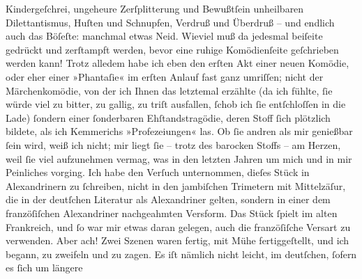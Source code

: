 \begin{ledgroupsized}[t]{13cm}
               Kindergeſchrei, ungeheure Zerſplitterung und Bewußtſein unheilbaren Dilettantismus,
               Huſten und Schnupfen, Verdruß und Überdruß – und endlich auch das Böſeſte: manchmal
               etwas Neid. Wieviel muß da jedesmal beiſeite gedrückt und zerſtampft werden, bevor
               eine ruhige Komödienſeite geſchrieben werden kann!\pend
           \pstart
           Trotz alledem habe ich eben den erſten Akt einer neuen Komödie, oder eher einer
               »Phantaſie« im erſten Anlauf fast ganz umriſſen; nicht der Märchenkomödie, von der ich Ihnen das
               letztemal erzählte (da ich fühlte, ſie würde viel zu bitter, zu gallig, zu triſt
               ausfallen, ſchob ich ſie entſchloſſen in die Lade) ſondern einer ſonderbaren Ehſtandstragödie, deren Stoff ſich
               plötzlich bildete, als ich Kemmerichs »Profezeiungen« las. Ob ſie andren als mir genießbar
               ſein wird, weiß ich nicht; mir liegt ſie – trotz des ba{\pb}rocken Stoffs – am Herzen, weil ſie viel aufzunehmen vermag, was in den letzten
               Jahren um mich und in mir Peinliches vorging.\pend
           \pstart
           Ich habe den Verſuch unternommen, dieſes Stück in Alexandrinern zu ſchreiben, nicht
               in den jambiſchen Trimetern mit Mittelzäſur, die in der deutſchen Literatur als
               Alexandriner gelten, sondern in einer dem franzöſiſchen Alexandriner nachgeahmten Versform. Das Stück ſpielt im alten
                  Frankreich, und ſo war mir etwas daran gelegen,
               auch die franzöſiſche Versart zu verwenden. Aber
               ach! Zwei Szenen waren fertig, mit Mühe fertiggeſtellt, und ich begann, zu zweifeln
               und zu zagen. Es iſt nämlich nicht leicht, im deutſchen, ſofern es ſich um längere

\end{ledgroupsized}
